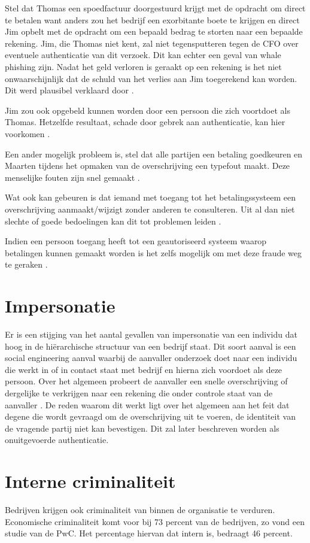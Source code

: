 Stel dat Thomas een spoedfactuur doorgestuurd krijgt met de opdracht om direct
te betalen want anders zou het bedrijf een exorbitante boete te krijgen en
direct Jim opbelt met de opdracht om een bepaald bedrag te storten naar een
bepaalde rekening. Jim, die Thomas niet kent, zal niet tegensputteren tegen de
CFO over eventuele authenticatie van dit verzoek. Dit kan echter een geval van
whale phishing zijn. Nadat het geld verloren is geraakt op een rekening is het
niet onwaarschijnlijk dat de schuld van het verlies aan Jim toegerekend kan
worden. Dit werd plausibel verklaard door \textcite{VanDenBulckeTom}.

Jim zou ook opgebeld kunnen worden door een persoon die zich voortdoet
als Thomas. Hetzelfde resultaat, schade door gebrek aan authenticatie, kan hier
voorkomen \autocite{VanDenBulckeTom, VanDerBeekImpersonatieMarqit}.

Een ander mogelijk probleem is, stel dat alle partijen een betaling goedkeuren en
Maarten tijdens het opmaken van de overschrijving een typefout maakt. Deze
menselijke fouten zijn snel gemaakt \autocite{VanDenBulckeTom, DeprezArne}.

Wat ook kan gebeuren is dat iemand met toegang tot het betalingssysteem een
overschrijving aanmaakt/wijzigt zonder anderen te consulteren. Uit al dan niet
slechte of goede bedoelingen kan dit tot problemen leiden
\autocite{VanDenBulckeTom, DeprezArne}.

Indien een persoon toegang heeft tot een geautoriseerd systeem waarop betalingen
kunnen gemaakt worden is het zelfs mogelijk om met deze fraude weg te geraken
\autocite{VanDenBulckeTom}.

\section{Impersonatie}
Er is een stijging van het aantal gevallen van impersonatie van een individu dat
hoog in de hiërarchische structuur van een bedrijf staat. Dit soort aanval is
een social engineering aanval waarbij de aanvaller onderzoek doet naar een
individu die werkt in of in contact staat met bedrijf en hierna zich voordoet
als deze persoon. Over het algemeen probeert de aanvaller een snelle
overschrijving of dergelijke te verkrijgen naar een rekening die onder controle
staat van de aanvaller \autocite{VanDerBeekImpersonatieMarqit,
	DeignImpersonatieTheGuardian}. De reden waarom dit werkt ligt over het algemeen
aan het feit dat degene die wordt gevraagd om de overschrijving uit te voeren,
de identiteit van de vragende partij niet kan bevestigen. Dit zal later
beschreven worden als onuitgevoerde authenticatie.

\section{Interne criminaliteit}
Bedrijven krijgen ook criminaliteit van binnen de organisatie te verduren.
Economische criminaliteit komt voor bij 73 percent van de bedrijven, zo vond een
studie van de PwC. Het percentage hiervan dat intern is, bedraagt 46 percent.
\autocite{EconomicCrimeSurvey, Ashford2015}
